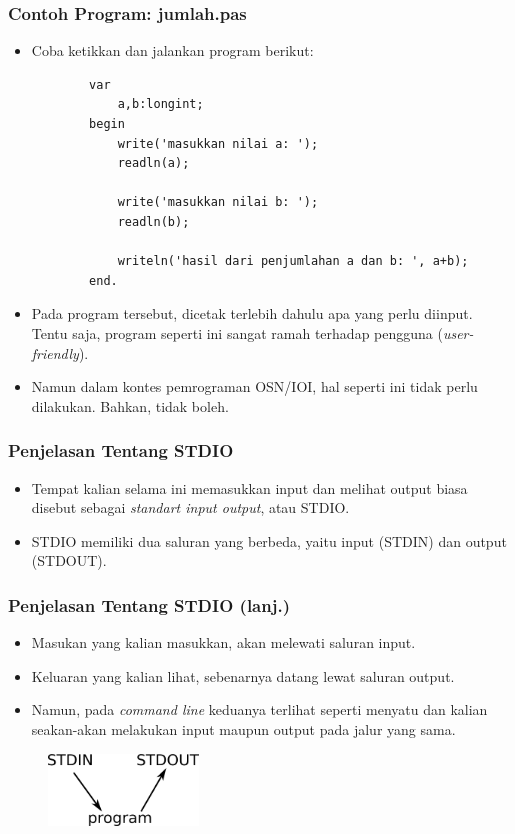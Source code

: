 \documentclass{beamer}
\begin{document}
\begin{frame}[fragile]
\frametitle{Contoh Program: jumlah.pas}
\begin{itemize}
	\item Coba ketikkan dan jalankan program berikut:
	\begin{lstlisting}
		var
		    a,b:longint;
		begin
		    write('masukkan nilai a: ');
		    readln(a);
		    
		    write('masukkan nilai b: ');
		    readln(b);
		    
		    writeln('hasil dari penjumlahan a dan b: ', a+b);
		end.
	\end{lstlisting}
	\item Pada program tersebut, dicetak terlebih dahulu apa yang perlu diinput. Tentu saja, program seperti ini sangat ramah terhadap pengguna (\textit{user-friendly}).
	\item Namun dalam kontes pemrograman OSN/IOI, hal seperti ini tidak perlu dilakukan. Bahkan, tidak boleh.
\end{itemize}
\end{frame}

\begin{frame}
\frametitle{Penjelasan Tentang STDIO}
\begin{itemize}
	\item Tempat kalian selama ini memasukkan input dan melihat output biasa disebut sebagai \textit{standart input output}, atau STDIO.
	\item STDIO memiliki dua saluran yang berbeda, yaitu input (STDIN) dan output (STDOUT).
\end{itemize}
\end{frame}

\begin{frame}
\frametitle{Penjelasan Tentang STDIO (lanj.)}
\begin{itemize}
	\item Masukan yang kalian masukkan, akan melewati saluran input.
	\item Keluaran yang kalian lihat, sebenarnya datang lewat saluran output.
	\item Namun, pada \textit{command line} keduanya terlihat seperti menyatu dan kalian seakan-akan melakukan input maupun output pada jalur yang sama.
\end{itemize}
\begin{figure}
	\includegraphics[width=4cm]{asset/g1.png}
\end{figure}
\end{frame}
\end{document}
